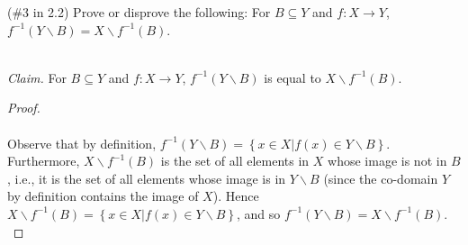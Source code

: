 (\#3 in 2.2) Prove or disprove the following:
For $B\subseteq Y$ and $f:X\to Y$, $f^{-1}(Y\backslash B)=X\backslash f^{-1}(B)$. 

\ \\
\emph{Claim.} For $B\subseteq Y$ and $f:X\to Y$, $f^{-1}(Y\backslash B)$ is 
equal to $X\backslash f^{-1}(B)$.

\begin{proof}\ \\\\
    Observe that by definition, $f^{-1}(Y \backslash B) = \left\{x \in X | f(x) \in Y \backslash B\right\}$.
    Furthermore, $X \backslash f^{-1}(B)$ is the set of all elements in $X$ whose image is not in $B$, i.e., it
    is the set of all elements whose image is in $Y \backslash B$ (since the co-domain $Y$ by definition contains the
    image of $X$). Hence $X \backslash f^{-1}(B) = \left\{x \in X | f(x) \in Y \backslash B\right\}$, and so
    $f^{-1}(Y\backslash B) = X\backslash f^{-1}(B)$.
    \ \\
\end{proof}
